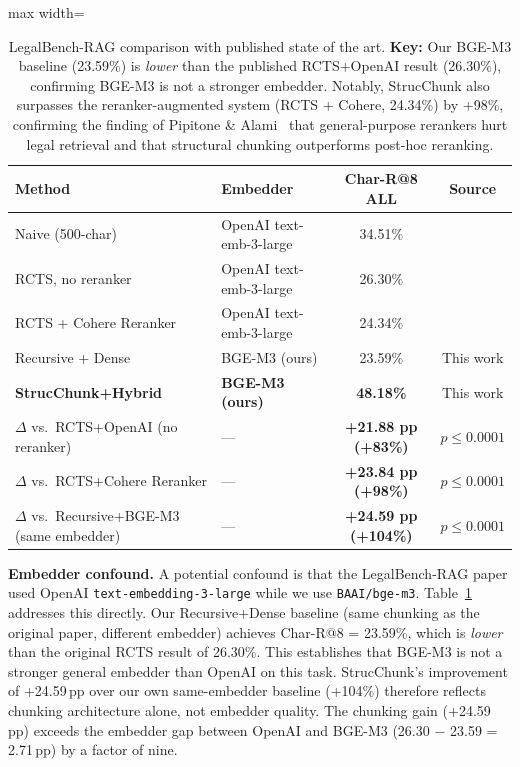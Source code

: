 \documentclass[sn-mathphys,Numbered]{sn-jnl}%
\begin{document}
\begin{table}[htbp]
\centering
\begin{adjustbox}{max width=\textwidth}
\begin{tabular}{llcc}
\toprule
\textbf{Method} & \textbf{Embedder}
  & \textbf{Char-R@8 ALL} & \textbf{Source} \\
\midrule
Naive (500-char)           & OpenAI text-emb-3-large & 34.51\%
  & \cite{pipitone2024legalbenchragbenchmarkretrievalaugmentedgeneration} \\
RCTS, no reranker          & OpenAI text-emb-3-large & 26.30\%
  & \cite{pipitone2024legalbenchragbenchmarkretrievalaugmentedgeneration} \\
RCTS + Cohere Reranker     & OpenAI text-emb-3-large & 24.34\%
  & \cite{pipitone2024legalbenchragbenchmarkretrievalaugmentedgeneration} \\
\midrule
Recursive + Dense          & BGE-M3 (ours)           & 23.59\%
  & This work \\
\textbf{StrucChunk+Hybrid} & \textbf{BGE-M3 (ours)}  & \textbf{48.18\%}
  & This work \\
\midrule
$\Delta$ vs.\ RCTS+OpenAI (no reranker)
  & --- & \textbf{+21.88 pp (+83\%)} & $p \leq 0.0001$ \\
$\Delta$ vs.\ RCTS+Cohere Reranker
  & --- & \textbf{+23.84 pp (+98\%)} & $p \leq 0.0001$ \\
$\Delta$ vs.\ Recursive+BGE-M3 (same embedder)
  & --- & \textbf{+24.59 pp (+104\%)} & $p \leq 0.0001$ \\
\bottomrule
\end{tabular}
\end{adjustbox}
\caption{LegalBench-RAG comparison with published state of the art.
  \textbf{Key:} Our BGE-M3 baseline (23.59\%) is \emph{lower} than the
  published RCTS+OpenAI result (26.30\%), confirming BGE-M3 is not a stronger
  embedder.  Notably, StrucChunk also surpasses the reranker-augmented system
  (RCTS + Cohere, 24.34\%) by +98\%, confirming the finding of Pipitone \& Alami~\cite{pipitone2024legalbenchragbenchmarkretrievalaugmentedgeneration}
  that general-purpose rerankers hurt legal retrieval and that
  structural chunking outperforms post-hoc reranking.}
\label{tab:lbr_sota}
\end{table}

\textbf{Embedder confound.}  A potential confound is that the LegalBench-RAG paper used OpenAI \texttt{text-embedding-3-large} while we use \texttt{BAAI/bge-m3}.  Table~\ref{tab:lbr_sota} addresses this directly.  Our Recursive+Dense baseline (same chunking as the original paper, different embedder) achieves Char-R@8 = 23.59\%, which is \emph{lower} than the original RCTS result of 26.30\%.  This establishes that BGE-M3 is not a stronger general embedder than OpenAI on this task.  StrucChunk's improvement of +24.59\,pp over our own same-embedder baseline (+104\%) therefore reflects chunking architecture alone, not embedder quality.  The chunking gain (+24.59\,pp) exceeds the embedder gap between OpenAI and BGE-M3 (26.30 $-$ 23.59 = 2.71\,pp) by a factor of nine.
\end{document}
